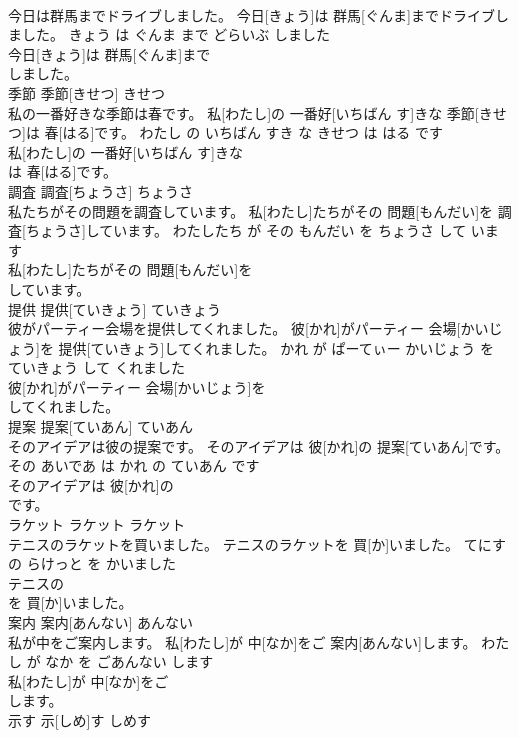 \documentclass[8pt]{extreport}
\begin{document}
\begin{CJK}{UTF8}{min}
\\	今日は群馬までドライブしました。	今日[きょう]は 群馬[ぐんま]までドライブしました。	きょう は ぐんま まで どらいぶ しました	
\\	今日[きょう]は 群馬[ぐんま]まで
\\	しました。		
\\	季節	季節[きせつ]	きせつ	
\\	私の一番好きな季節は春です。	私[わたし]の 一番好[いちばん す]きな 季節[きせつ]は 春[はる]です。	わたし の いちばん すき な きせつ は はる です	
\\	私[わたし]の 一番好[いちばん す]きな
\\	は 春[はる]です。		
\\	調査	調査[ちょうさ]	ちょうさ	
\\	私たちがその問題を調査しています。	私[わたし]たちがその 問題[もんだい]を 調査[ちょうさ]しています。	わたしたち が その もんだい を ちょうさ して います	
\\	私[わたし]たちがその 問題[もんだい]を
\\	しています。		
\\	提供	提供[ていきょう]	ていきょう	
\\	彼がパーティー会場を提供してくれました。	彼[かれ]がパーティー 会場[かいじょう]を 提供[ていきょう]してくれました。	かれ が ぱーてぃー かいじょう を ていきょう して くれました	
\\	彼[かれ]がパーティー 会場[かいじょう]を
\\	してくれました。		
\\	提案	提案[ていあん]	ていあん	
\\	そのアイデアは彼の提案です。	そのアイデアは 彼[かれ]の 提案[ていあん]です。	その あいであ は かれ の ていあん です	
\\	そのアイデアは 彼[かれ]の
\\	です。		
\\	ラケット	ラケット	ラケット	
\\	テニスのラケットを買いました。	テニスのラケットを 買[か]いました。	てにす の らけっと を かいました	
\\	テニスの
\\	を 買[か]いました。		
\\	案内	案内[あんない]	あんない	
\\	私が中をご案内します。	私[わたし]が 中[なか]をご 案内[あんない]します。	わたし が なか を ごあんない します	
\\	私[わたし]が 中[なか]をご
\\	します。		
\\	示す	示[しめ]す	しめす	

\end{CJK}
\end{document}
